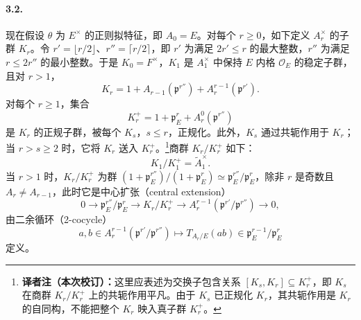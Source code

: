 \paragraph*{3.2.}现在假设 $\theta$ 为 $E^\times$ 的正则拟特征，即 $A_0=E$。对每个 $r\geq0$，如下定义 $A_r^\times$ 的子群 $K_r$。令 $r'=\lfloor r/2\rfloor$、$r''=\lceil r/2\rceil$，即 $r'$ 为满足 $2r'\leq r$ 的最大整数，$r''$ 为满足 $r\leq2r''$ 的最小整数。于是 $K_0=F^\times$，$K_1$ 是 $A_1^\times$ 中保持 $E$ 内格 $\mathcal O_E$ 的稳定子群，且对 $r>1$，
\[
K_r=1+A_{r-1}(\mathfrak p^{r''})+A_r^{r-1}(\mathfrak p^{r'}).
\]
对每个 $r\geq1$，集合
\[
K_r^+=1+\mathfrak p_E^r+A_r^0(\mathfrak p^{r''})
\]
是 $K_r$ 的正规子群，被每个 $K_s$，$s\leq r$，正规化。此外，$K_s$ 通过共轭作用于 $K_r$；当 $r>s\geq2$ 时，它将 $K_r$ 送入 $K_r^+$。\footnote{\textbf{译者注（本次校订）：}这里应表述为交换子包含关系 $[K_s,K_r]\subseteq K_r^+$，即 $K_s$ 在商群 $K_r/K_r^+$ 上的共轭作用平凡。由于 $K_s$ 已正规化 $K_r$，其共轭作用是 $K_r$ 的自同构，不能把整个 $K_r$ 映入真子群 $K_r^+$。}商群 $K_r/K_r^+$ 如下：
\[
K_1/K_1^+=\widetilde A_1^\times.
\]
当 $r>1$ 时，$K_r/K_r^+$ 为群 $(1+\mathfrak p_E^{r''})/(1+\mathfrak p_E^r)\simeq\mathfrak p_E^{r''}/\mathfrak p_E^r$，除非 $r$ 是奇数且 $A_r\ne A_{r-1}$，此时它是中心扩张（central extension）
\[
0\longrightarrow\mathfrak p_E^{r''}/\mathfrak p_E^r\longrightarrow K_r/K_r^+\longrightarrow A_r^{r-1}(\mathfrak p^{r'}/\mathfrak p^{r''})\longrightarrow0,
\]
由二余循环（2-cocycle）
\[
a,b\in A_r^{r-1}(\mathfrak p^{r'}/\mathfrak p^{r''})\longmapsto T_{A_r/E}(ab)\in\mathfrak p_E^{r-1}/\mathfrak p_E^r
\]
定义。
